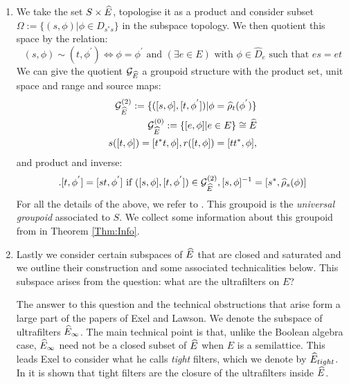 \begin{definition}
\begin{enumerate}
\item We take the set $S \times \widehat{E}$, topologise it as a product and consider subset $\Omega:= \lbrace (s, \phi) | \phi \in D_{s^{*}s} \rbrace$ in the subspace topology. We then quotient this space by the relation:
\begin{equation*}
(s, \phi) \sim (t, \phi^{'}) \Leftrightarrow \phi=\phi^{'} \mbox{ and } (\exists e \in E) \mbox{ with } \phi \in \widehat{D}_{e} \mbox{ such that } es=et
\end{equation*}
We can give the quotient $\mathcal{G}_{\widehat{E}}$ a groupoid structure with the product set, unit space and range and source maps:
\begin{eqnarray*}
\mathcal{G}_{\widehat{E}}^{(2)}:=\lbrace ([s,\phi],[t,\phi^{'}]) | \phi=\widehat{\rho}_{t}(\phi^{'}) \rbrace \\
\mathcal{G}_{\widehat{E}}^{(0)}:= \lbrace [e,\phi] | e \in E \rbrace \cong \widehat{E} \\
s([t,\phi])=[t^{*}t,\phi], r([t,\phi])=[tt^{*},\phi], 
\end{eqnarray*}
and product and inverse:
\begin{eqnarray*}
[s,\phi].[t,\phi^{'}]= [st,\phi^{'}] \mbox{ if } ([s,\phi],[t,\phi^{'}]) \in \G_{\E}^{(2)}, [s,\phi]^{-1} = [s^{*},\widehat{\rho}_{s}(\phi)] 
\end{eqnarray*}
For all the details of the above, we refer to \cite[Section 4]{MR2419901}. This groupoid is the \textit{universal groupoid} associated to $S$. We collect some information about this groupoid from \cite{MR2419901,MR1724106} in Theorem \ref{Thm:Info}.
\item Lastly we consider certain subspaces of $\widehat{E}$ that are closed and saturated and we outline their construction and some associated technicalities below. This subspace arises from the question: what are the ultrafilters on $E$?

The answer to this question and the technical obstructions that arise form a large part of the papers \cite{MR2419901,MR2672179} of Exel and Lawson. We denote the subspace of ultrafilters $\widehat{E}_{\infty}$. The main technical point is that, unlike the Boolean algebra case, $\widehat{E}_{\infty}$ need not be a closed subset of $\widehat{E}$ when $E$ is a semilattice. This leads Exel to consider what he calls \textit{tight} filters, which we denote by $\widehat{E}_{tight}$. In \cite{MR2419901} it is shown that tight filters are the closure of the ultrafilters inside $\widehat{E}$. 

\end{enumerate}
\end{definition}

